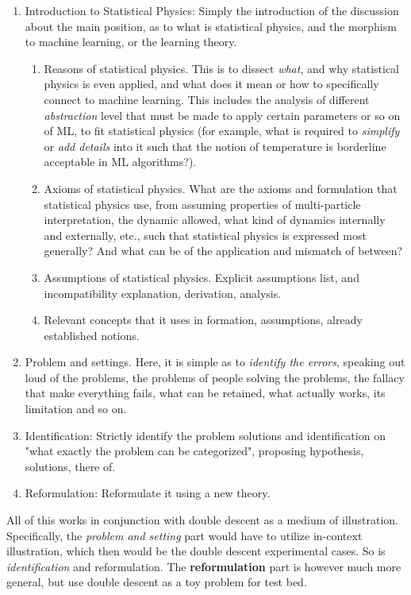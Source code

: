 \documentclass[
  journal=largetwo,
  year=2025,
  volume=37,
]{cup-journal}
\begin{document}
\begin{enumerate}
    \item Introduction to Statistical Physics: Simply the introduction of the discussion about the main position, as to what is statistical physics, and the morphism to machine learning, or the learning theory. 
    \begin{enumerate}
        \item Reasons of statistical physics. This is to dissect \textit{what}, and why statistical physics is even applied, and what does it mean or how to specifically connect to machine learning. This includes the analysis of different \textit{abstraction} level that must be made to apply certain parameters or so on of ML, to fit statistical physics (for example, what is required to \textit{simplify} or \textit{add details} into it such that the notion of temperature is borderline acceptable in ML algorithms?).
        \item Axioms of statistical physics. What are the axioms and formulation that statistical physics use, from assuming properties of multi-particle interpretation, the dynamic allowed, what kind of dynamics internally and externally, etc., such that statistical physics is expressed most generally? And what can be of the application and mismatch of between? 
        \item Assumptions of statistical physics. Explicit assumptions list, and incompatibility explanation, derivation, analysis. 
        \item Relevant concepts that it uses in formation, assumptions, already established notions. 
    \end{enumerate}
    \item Problem and settings. Here, it is simple as to \textit{identify the errors}, speaking out loud of the problems, the problems of people solving the problems, the fallacy that make everything fails, what can be retained, what actually works, its limitation and so on. 
    \item Identification: Strictly identify the problem solutions and identification on "what exactly the problem can be categorized", proposing hypothesis, solutions, there of. 
    \item Reformulation: Reformulate it using a new theory. 
\end{enumerate}

All of this works in conjunction with double descent as a medium of illustration. Specifically, the \textit{problem and setting} part would have to utilize in-context illustration, which then would be the double descent experimental cases. So is \textit{identification} and reformulation. The \textbf{reformulation} part is however much more general, but use double descent as a toy problem for test bed. 

\clearpage

\clearpage

\nocite{*}
\printbibliography
\end{document}
